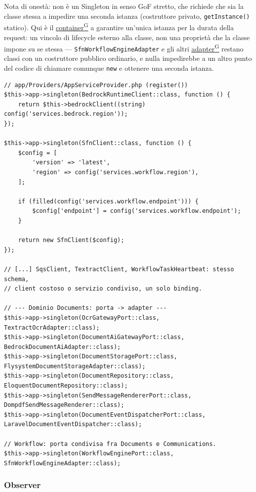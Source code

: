 \documentclass[a4paper,12pt]{article}
\providecommand{\glslink}[2]{\href{https://alittlebyte-19.github.io/Documentazione/glossario.html\#gls-#1}{\underline{#2}\textsuperscript{\scriptsize G}}}
\begin{document}
\begin{sloppypar}
Nota di onestà: non è un Singleton in senso GoF stretto, che richiede che sia la classe stessa a impedire una seconda istanza (costruttore privato, \texttt{getInstance()} statico). Qui è il \glslink{container}{container} a garantire un'unica istanza per la durata della request: un vincolo di lifecycle esterno alla classe, non una proprietà che la classe impone su se stessa — \texttt{SfnWorkflowEngineAdapter} e gli altri \glslink{adapter}{adapter} restano classi con un costruttore pubblico ordinario, e nulla impedirebbe a un altro punto del codice di chiamare comunque \texttt{new} e ottenere una seconda istanza.

\begin{lstlisting}[style=phplisting, caption={AppServiceProvider -- binding singleton dei client AWS e delle porte secondarie}]
// app/Providers/AppServiceProvider.php (register())
$this->app->singleton(BedrockRuntimeClient::class, function () {
    return $this->bedrockClient((string) config('services.bedrock.region'));
});

$this->app->singleton(SfnClient::class, function () {
    $config = [
        'version' => 'latest',
        'region' => config('services.workflow.region'),
    ];

    if (filled(config('services.workflow.endpoint'))) {
        $config['endpoint'] = config('services.workflow.endpoint');
    }

    return new SfnClient($config);
});

// [...] SqsClient, TextractClient, WorkflowTaskHeartbeat: stesso schema,
// client costoso o servizio condiviso, un solo binding.

// --- Dominio Documents: porta -> adapter ---
$this->app->singleton(OcrGatewayPort::class, TextractOcrAdapter::class);
$this->app->singleton(DocumentAiGatewayPort::class, BedrockDocumentAiAdapter::class);
$this->app->singleton(DocumentStoragePort::class, FlysystemDocumentStorageAdapter::class);
$this->app->singleton(DocumentRepository::class, EloquentDocumentRepository::class);
$this->app->singleton(SendMessageRendererPort::class, DompdfSendMessageRenderer::class);
$this->app->singleton(DocumentEventDispatcherPort::class, LaravelDocumentEventDispatcher::class);

// Workflow: porta condivisa fra Documents e Communications.
$this->app->singleton(WorkflowEnginePort::class, SfnWorkflowEngineAdapter::class);
\end{lstlisting}

\subsubsection{Observer}


\end{sloppypar}
\end{document}
